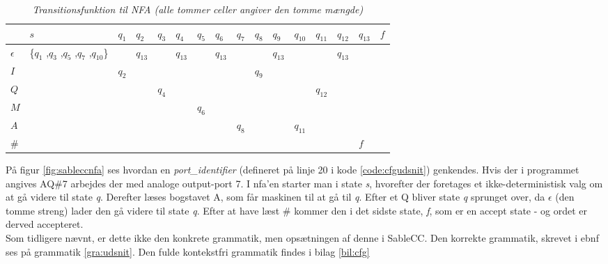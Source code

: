 \begin{table}[H]
\begin{tabular}{|l|l|l|l|l|l|l|l|l|l|l|l|l|l|l|l|}
\hline
           & $s$              & $q_{1}$ & $q_{2}$ & $q_{3}$ & $q_{4}$ & $q_{5}$ & $q_{6}$ & $q_{7}$ & $q_{8}$ & $q_{9}$ & $q_{10}$ & $q_{11}$ & $q_{12}$ & $q_{13}$ & $f$ \\ \hline
$\epsilon$ & \{$q_{1}$ ,$q_{3}$ ,$q_{5}$ ,$q_{7}$ ,$q_{10}$\} &   & $q_{13}$ &   & $q_{13}$ &   & $q_{13}$ &   &   & $q_{13}$ &    &    & $q_{13}$ &    &   \\ \hline
$I$          &                & $q_{2}$ &    &   &    &   &    &   & $q_{9}$ &    &    &    &    &    &   \\ \hline
$Q$          &                &   &    & $q_{4}$ &    &   &    &   &   &    &    & $q_{12}$ &    &    &   \\ \hline
$M$          &                &   &    &   &    & $q_{6}$ &    &   &   &    &    &    &    &    &   \\ \hline
$A$          &                &   &    &   &    &   &    & $q_{8}$ &   &    & $q_{11}$ &    &    &    &   \\ \hline
\#         &                &   &    &   &    &   &    &   &   &    &    &    &    & $f$  &   \\ \hline
\end{tabular}
	\caption{\textit{Transitionsfunktion til NFA (alle tommer celler angiver den tomme mængde)}}
    \label{tab:nfadelta}
\end{table}

\noindent På figur \ref{fig:sableccnfa} ses hvordan en \textit{port\_identifier} (defineret på linje 20 i kode \ref{code:cfgudsnit}) genkendes. Hvis der i programmet angives AQ\#7 arbejdes der med analoge output-port 7. I \gls{nfa}'en starter man i state \textit{s}, hvorefter der foretages et ikke-deterministisk valg om at gå videre til state  \textit{q}. Derefter læses bogstavet A, som får maskinen til at gå til \textit{q}. Efter et Q bliver state \textit{q} sprunget over, da $\epsilon$ (den tomme streng) lader den gå videre til state \textit{q}. Efter at have læst \# kommer den i det sidste state, \textit{f}, som er en accept state - og ordet er derved accepteret. \\

\noindent Som tidligere nævnt, er dette ikke den konkrete grammatik, men opsætningen af denne i SableCC. Den korrekte grammatik, skrevet i \gls{ebnf} ses på grammatik \ref{gra:udsnit}. Den fulde kontekstfri grammatik findes i bilag \ref{bil:cfg}

